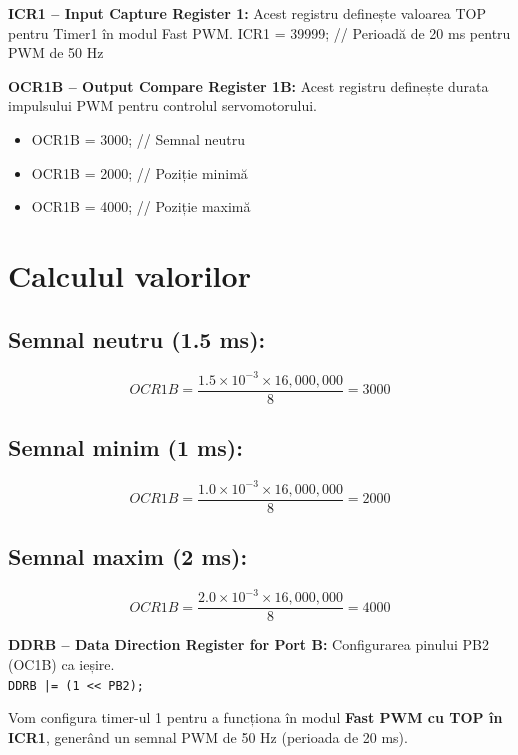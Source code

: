 \documentclass{report}
\begin{document}
\textbf{ICR1 – Input Capture Register 1:} Acest registru definește valoarea TOP pentru Timer1 în modul Fast PWM.
ICR1 = 39999; // Perioadă de 20 ms pentru PWM de 50 Hz

\textbf{ OCR1B – Output Compare Register 1B:} Acest registru definește durata impulsului PWM pentru controlul servomotorului.
\begin{itemize}
    \item OCR1B = 3000; // Semnal neutru
    \item OCR1B = 2000; // Poziție minimă
    \newpage 
    \vspace*{1cm}
    \item OCR1B = 4000; // Poziție maximă
\end{itemize}
\section*{Calculul valorilor}

\subsection*{Semnal neutru (1.5 ms):}
\[
OCR1B = \frac{1.5 \times 10^{-3} \times 16,000,000}{8} = 3000
\]

\subsection*{Semnal minim (1 ms):}
\[
OCR1B = \frac{1.0 \times 10^{-3} \times 16,000,000}{8} = 2000
\]

\subsection*{Semnal maxim (2 ms):}
\[
OCR1B = \frac{2.0 \times 10^{-3} \times 16,000,000}{8} = 4000
\]


\textbf{DDRB – Data Direction Register for Port B:} Configurarea pinului PB2 (OC1B) ca ieșire.\\
\texttt{DDRB |= (1 << PB2);}

Vom configura timer-ul 1 pentru a funcționa în modul \textbf{Fast PWM cu TOP în ICR1}, generând un semnal PWM de 50 Hz (perioada de 20 ms).
\end{document}
